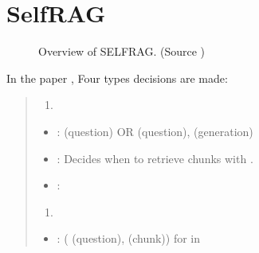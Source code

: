 \documentclass[letterpaper,11pt,english]{sphinxmanual}
\begin{document}
\section{Self\sphinxhyphen{}RAG}
\label{\detokenize{rag:self-rag}}\label{\detokenize{rag:ch-self-rag}}
\begin{figure}[htbp]
\centering
\capstart

\noindent{}
\caption{Overview of SELF\sphinxhyphen{}RAG. (Source )}\label{\detokenize{rag:id56}}\label{\detokenize{rag:fig-self-rag-paper}}\end{figure}

\sphinxAtStartPar
In the paper , Four types decisions are made:
\begin{quote}
\begin{enumerate}
%
\item {} 
\sphinxAtStartPar
{}

\end{enumerate}
\begin{itemize}
\item {} 
\sphinxAtStartPar
{}:
\sphinxhyphen{}  (question)
\sphinxhyphen{} OR  (question),  (generation)

\item {} 
\sphinxAtStartPar
{}:
Decides when to retrieve  chunks with .

\item {} 
\sphinxAtStartPar
{}:
\sphinxhyphen{} 
\sphinxhyphen{} 
\sphinxhyphen{} 

\end{itemize}
\begin{enumerate}
%
\setcounter{enumi}{1}
\item {} 
\sphinxAtStartPar
{}

\end{enumerate}
\begin{itemize}
\item {} 
\sphinxAtStartPar
{}:
\sphinxhyphen{} ( (question),  (chunk)) for  in 


\end{itemize}
\end{quote}
\end{document}
